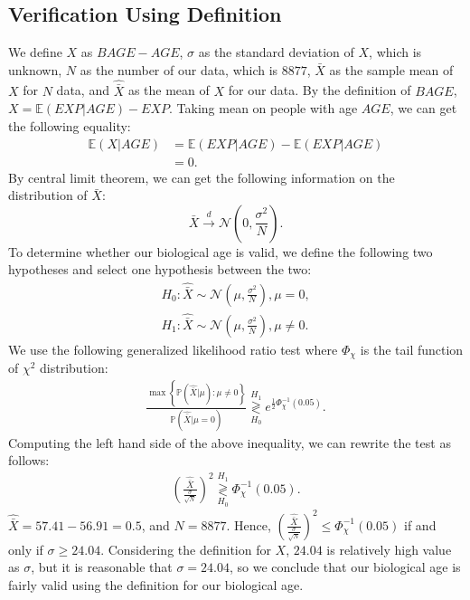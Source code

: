 \subsection{Verification Using Definition}
We define $X$ as $BAGE - AGE$, $\sigma$ as the standard deviation of $X$, which is unknown, $N$ as the number of our data, which is $8877$, $\bar{X}$ as the sample mean of $X$ for $N$ data, and $\hat{\bar{X}}$ as the mean of $X$ for our data. By the definition of $BAGE$, $X = \mathbb{E}\left(EXP | AGE\right) - EXP$. Taking mean on people with age $AGE$, we can get the following equality:
\begin{align*}
\mathbb{E}\left(X | AGE\right) &= \mathbb{E}\left(EXP | AGE\right) - \mathbb{E}\left(EXP | AGE\right)\\
&= 0.
\end{align*}
By central limit theorem, we can get the following information on the distribution of $\bar{X}$:
$$
\bar{X} \xrightarrow[]{d} \mathcal{N}\left(0, \frac{\sigma^2}{N}\right).
$$
To determine whether our biological age is valid, we define the following two hypotheses and select one hypothesis between the two:
\begin{gather*}
H_0: \hat{\bar{X}} \sim \mathcal{N}\left(\mu, \frac{\sigma^2}{N}\right), \mu = 0,\\
H_1: \hat{\bar{X}} \sim \mathcal{N}\left(\mu, \frac{\sigma^2}{N}\right), \mu \ne 0.
\end{gather*}
We use the following generalized likelihood ratio test where $\Phi_\chi$ is the tail function of $\chi^2$ distribution:
\begin{gather*}
\frac{\max\left\{\mathbb{P}\left(\hat{\bar{X}} | \mu\right): \mu \ne 0\right\}}{\mathbb{P}\left(\hat{\bar{X}} | \mu = 0\right)} \underset{H_0}{\overset{H_1}{\gtrless}} e^{\frac{1}{2} \Phi_\chi^{-1}\left(0.05\right)}.
\end{gather*}
Computing the left hand side of the above inequality, we can rewrite the test as follows:
\begin{gather*}
\left(\frac{\hat{\bar{X}}}{\frac{\sigma}{\sqrt{N}}}\right)^2 \underset{H_0}{\overset{H_1}{\gtrless}} \Phi_\chi^{-1}\left(0.05\right).
\end{gather*}
$\hat{\bar{X}} = 57.41 - 56.91 = 0.5$, and $N = 8877$. Hence, $\left(\frac{\hat{\bar{X}}}{\frac{\sigma}{\sqrt{N}}}\right)^2 \le \Phi_\chi^{-1}\left(0.05\right)$ if and only if $\sigma \ge 24.04$. Considering the definition for $X$, $24.04$ is relatively high value as $\sigma$, but it is reasonable that $\sigma = 24.04$, so we conclude that our biological age is fairly valid using the definition for our biological age.

